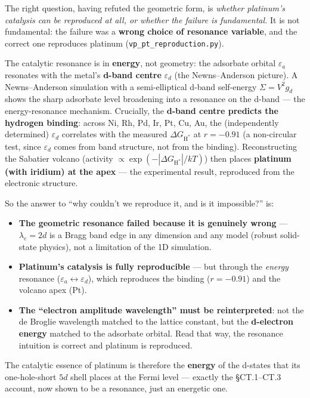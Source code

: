 \documentclass[
  10pt,
]{article}
\providecommand{\tightlist}{%
  \setlength{\itemsep}{0pt}\setlength{\parskip}{0pt}}
\begin{document}
The right question, having refuted the geometric form, is \emph{whether
platinum's catalysis can be reproduced at all, or whether the failure is
fundamental.} It is not fundamental: the failure was a \textbf{wrong
choice of resonance variable}, and the correct one reproduces platinum
(\texttt{vp\_pt\_reproduction.py}).

The catalytic resonance is in \textbf{energy}, not geometry: the
adsorbate orbital \(\varepsilon_a\) resonates with the metal's
\textbf{d-band centre} \(\varepsilon_d\) (the Newns--Anderson picture).
A Newns--Anderson simulation with a semi-elliptical d-band self-energy
\(\Sigma = V^2 g_d\) shows the sharp adsorbate level broadening into a
resonance on the d-band --- the energy-resonance mechanism. Crucially,
the \textbf{d-band centre predicts the hydrogen binding}: across Ni, Rh,
Pd, Ir, Pt, Cu, Au, the (independently determined) \(\varepsilon_d\)
correlates with the measured \(\Delta G_{\mathrm H^*}\) at \(r = -0.91\)
(a non-circular test, since \(\varepsilon_d\) comes from band structure,
not from the binding). Reconstructing the Sabatier volcano (activity
\(\propto \exp(-|\Delta G_{\mathrm H^*}|/kT)\)) then places
\textbf{platinum (with iridium) at the apex} --- the experimental
result, reproduced from the electronic structure.

So the answer to ``why couldn't we reproduce it, and is it impossible?''
is:

\begin{itemize}
\tightlist
\item
  \textbf{The geometric resonance failed because it is genuinely wrong}
  --- \(\lambda_e = 2d\) is a Bragg band edge in any dimension and any
  model (robust solid-state physics), not a limitation of the 1D
  simulation.
\item
  \textbf{Platinum's catalysis is fully reproducible} --- but through
  the \emph{energy} resonance
  (\(\varepsilon_a \leftrightarrow \varepsilon_d\)), which reproduces
  the binding (\(r=-0.91\)) and the volcano apex (Pt).
\item
  \textbf{The ``electron amplitude wavelength'' must be reinterpreted}:
  not the de Broglie wavelength matched to the lattice constant, but the
  \textbf{d-electron energy} matched to the adsorbate orbital. Read that
  way, the resonance intuition is correct and platinum is reproduced.
\end{itemize}

The catalytic essence of platinum is therefore the \textbf{energy} of
the d-states that its one-hole-short \(5d\) shell places at the Fermi
level --- exactly the §CT.1--CT.3 account, now shown to be a resonance,
just an energetic one.
\end{document}
